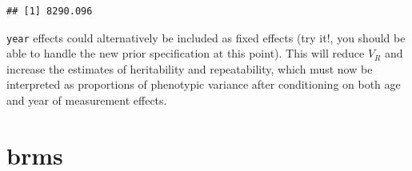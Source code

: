 \documentclass[
  12pt,
]{book}
\newenvironment{Shaded}{\begin{snugshade}}{\end{snugshade}}
\newcommand{\DataTypeTok}[1]{\textcolor[rgb]{0.13,0.29,0.53}{#1}}
\newcommand{\DecValTok}[1]{\textcolor[rgb]{0.00,0.00,0.81}{#1}}
\newcommand{\FloatTok}[1]{\textcolor[rgb]{0.00,0.00,0.81}{#1}}
\newcommand{\KeywordTok}[1]{\textcolor[rgb]{0.13,0.29,0.53}{\textbf{#1}}}
\newcommand{\NormalTok}[1]{#1}
\newcommand{\OperatorTok}[1]{\textcolor[rgb]{0.81,0.36,0.00}{\textbf{#1}}}
\newcommand{\StringTok}[1]{\textcolor[rgb]{0.31,0.60,0.02}{#1}}
\begin{document}
\begin{Shaded}
\end{Shaded}

\begin{verbatim}
## [1] 8290.096
\end{verbatim}

\texttt{year} effects could alternatively be included as fixed effects (try it!, you should be able to handle the new prior specification at this point). This will reduce \(V_R\) and increase the estimates of heritability and repeatability, which must now be interpreted as proportions of phenotypic variance after conditioning on both age and year of measurement effects.

\hypertarget{brms-3}{%
\section{brms}\label{brms-3}}

\begin{Shaded}
\end{Shaded}
\end{document}
